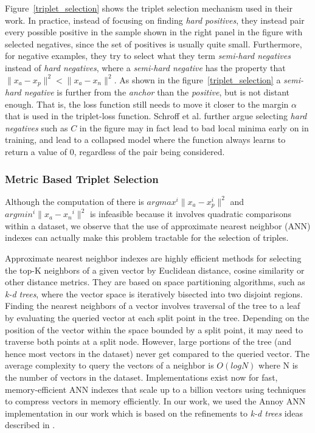Figure~\ref{triplet_selection} shows the triplet selection mechanism used in their work.  In practice, instead of focusing on finding \textit{hard positives}, they instead pair every possible positive in the sample shown in the right panel in the figure with selected negatives, since the set of positives is usually quite small.  Furthermore, for negative examples, they try to select what they term \textit{semi-hard negatives} instead of \textit{hard negatives}, where a \textit{semi-hard negative} has the property that $\|x_a - x_p \|^2 < \|x_a - x_n \|^2$.  As shown in the figure~\ref{triplet_selection} a \textit{semi-hard negative} is further from the \textit{anchor} than the \textit{positive}, but is not distant enough.  That is, the loss function still needs to move it closer to the margin $\alpha$ that is used in the triplet-loss function.  Schroff et al. further argue selecting \textit{hard negatives} such as $C$ in the figure may in fact lead to bad local minima early on in training, and lead to a collapsed model where the function always learns to return a value of 0, regardless of the pair being considered.

\subsubsection{Metric Based Triplet Selection}
Although the computation of there is $argmax^i \| x_{a} - x_{p}^i \|^2$ and $argmin^i \| x_{a} - x{_n}^i \|^2$ is infeasible because it involves quadratic comparisons within a dataset, we observe that the use of approximate nearest neighbor (ANN) indexes can actually make this problem tractable for the selection of triples.  

Approximate nearest neighbor indexes are highly efficient methods for selecting the top-K neighbors of a given vector by Euclidean distance, cosine similarity or other distance metrics.  They are based on space partitioning algorithms, such as \textit{k-d trees}, where the vector space is iteratively bisected into two disjoint regions.  Finding the nearest neighbors of a vector involves traversal of the tree to a leaf by evaluating the queried vector at each split point in the tree.  Depending on the position of the vector within the space bounded by a split point, it may need to traverse both points at a split node.  However, large portions of the tree (and hence most vectors in the dataset) never get compared to the queried vector.  The average complexity to query the vectors of a neighbor is $O(log N)$ where N is the number of vectors in the dataset.  Implementations exist now for fast, memory-efficient ANN indexes that scale up to a billion vectors \cite{JDH17} using techniques to compress vectors in memory efficiently.  In our work, we used the Annoy ANN implementation \cite{annoy_git} in our work which is based on the refinements to \textit{k-d trees} ideas described in \cite{ann_paper}.

